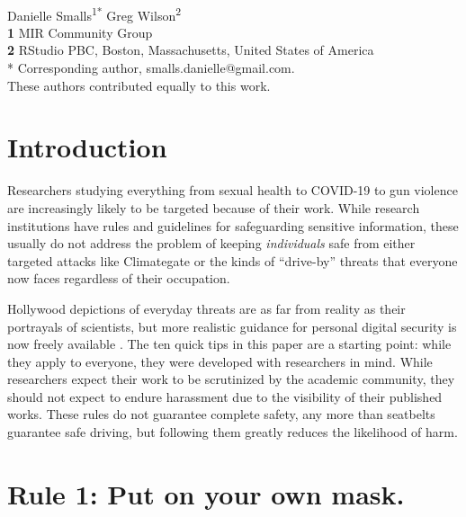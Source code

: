 \documentclass[10pt,letterpaper]{article}
\begin{document}
\vspace*{0.2in}

\begin{flushleft}
{\Large
\textbf{}
}
\newline
\\
{Danielle Smalls}\textsuperscript{1{\ddag}*}
{Greg Wilson}\textsuperscript{2{\ddag}}
\\
\bigskip
\textbf{1} MIR Community Group\\
\textbf{2} RStudio PBC, Boston, Massachusetts, United States of America\\
* Corresponding author, smalls.danielle@gmail.com. \\
\bigskip
{\ddag} These authors contributed equally to this work.
\end{flushleft}

\section*{Introduction}

Researchers studying everything from sexual health to COVID-19 to gun violence
are increasingly likely to be targeted because of their work.  While research
institutions have rules and guidelines for safeguarding sensitive information,
these usually do not address the problem of keeping \emph{individuals} safe from
either targeted attacks like Climategate \cite{Natu2010} or the kinds of
``drive-by'' threats that everyone now faces regardless of their occupation.

Hollywood depictions of everyday threats are as far from reality as their
portrayals of scientists, but more realistic guidance for personal digital
security is now freely available \cite{FLD,EFJ2015,EFF}. The ten quick tips in
this paper are a starting point: while they apply to everyone, they were
developed with researchers in mind. While researchers expect their work to be
scrutinized by the academic community, they should not expect to endure
harassment due to the visibility of their published works. These rules do not
guarantee complete safety, any more than seatbelts guarantee safe driving, but
following them greatly reduces the likelihood of harm.

\section*{Rule 1: Put on your own mask.}
\end{document}
